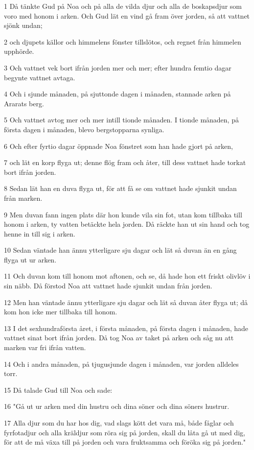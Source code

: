 \par 1 Då tänkte Gud på Noa och på alla de vilda djur och alla de boskapsdjur som voro med honom i arken. Och Gud lät en vind gå fram över jorden, så att vattnet sjönk undan;
\par 2 och djupets källor och himmelens fönster tillslötos, och regnet från himmelen upphörde.
\par 3 Och vattnet vek bort ifrån jorden mer och mer; efter hundra femtio dagar begynte vattnet avtaga.
\par 4 Och i sjunde månaden, på sjuttonde dagen i månaden, stannade arken på Ararats berg.
\par 5 Och vattnet avtog mer och mer intill tionde månaden. I tionde månaden, på första dagen i månaden, blevo bergstopparna synliga.
\par 6 Och efter fyrtio dagar öppnade Noa fönstret som han hade gjort på arken,
\par 7 och lät en korp flyga ut; denne flög fram och åter, till dess vattnet hade torkat bort ifrån jorden.
\par 8 Sedan lät han en duva flyga ut, för att få se om vattnet hade sjunkit undan från marken.
\par 9 Men duvan fann ingen plats där hon kunde vila sin fot, utan kom tillbaka till honom i arken, ty vatten betäckte hela jorden. Då räckte han ut sin hand och tog henne in till sig i arken.
\par 10 Sedan väntade han ännu ytterligare sju dagar och lät så duvan än en gång flyga ut ur arken.
\par 11 Och duvan kom till honom mot aftonen, och se, då hade hon ett friskt olivlöv i sin näbb. Då förstod Noa att vattnet hade sjunkit undan från jorden.
\par 12 Men han väntade ännu ytterligare sju dagar och lät så duvan åter flyga ut; då kom hon icke mer tillbaka till honom.
\par 13 I det sexhundraförsta året, i första månaden, på första dagen i månaden, hade vattnet sinat bort ifrån jorden. Då tog Noa av taket på arken och såg nu att marken var fri ifrån vatten.
\par 14 Och i andra månaden, på tjugusjunde dagen i månaden, var jorden alldeles torr.
\par 15 Då talade Gud till Noa och sade:
\par 16 "Gå ut ur arken med din hustru och dina söner och dina söners hustrur.
\par 17 Alla djur som du har hos dig, vad slags kött det vara må, både fåglar och fyrfotadjur och alla kräldjur som röra sig på jorden, skall du låta gå ut med dig, för att de må växa till på jorden och vara fruktsamma och föröka sig på jorden."
